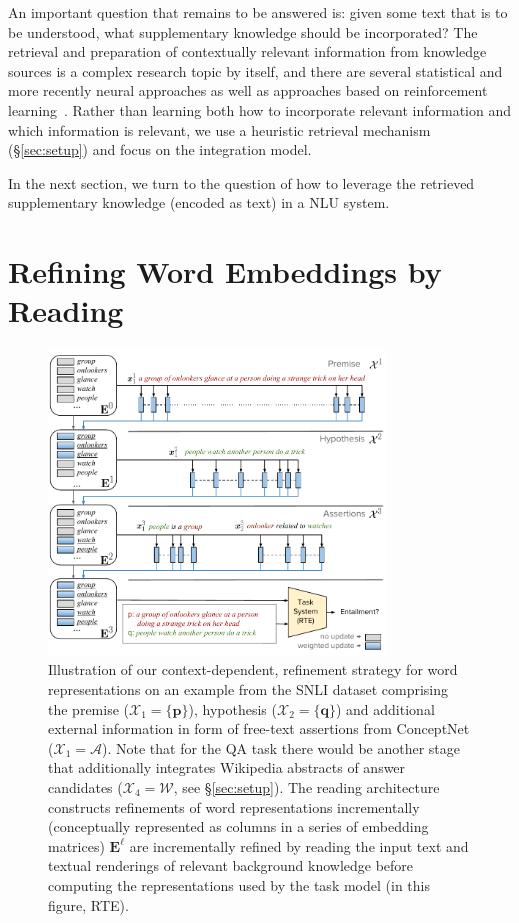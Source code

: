 \documentclass[11pt,a4paper]{article}
\begin{document}
An important question that remains to be answered is: given some text that is to be understood, what supplementary knowledge should be incorporated? The retrieval and preparation of contextually relevant information from knowledge sources is a complex research topic by itself, and there are several statistical \citep{Manning:2008} and more recently neural approaches \citep{mitra2017neural} as well as approaches based on reinforcement learning~\citep{nogueira2017}. Rather than learning both how to incorporate relevant information and which information is relevant, we use a heuristic retrieval mechanism (\S\ref{sec:setup}) and focus on the integration model.

In the next section, we turn to the question of how to leverage the retrieved supplementary knowledge (encoded as text) in a NLU system.

\section{Refining Word Embeddings by Reading}\label{sec:reading_stage}

\begin{figure}[ht!]
    \centering
    \includegraphics[width=0.8\textwidth]{illustration.pdf}
    \caption{Illustration of our context-dependent, refinement strategy for word representations on an example from the SNLI dataset comprising the premise ($\mathcal{X}_1 = \{\boldsymbol{p}\}$), hypothesis ($\mathcal{X}_2 = \{\boldsymbol{q}\}$) and additional external information in form of free-text assertions from ConceptNet ($\mathcal{X}_1 = \mathcal{A}$). Note that for the QA task there would be another stage that additionally integrates Wikipedia abstracts of answer candidates ($\mathcal{X}_4 = \mathcal{W}$, see \S\ref{sec:setup}). The reading architecture constructs refinements of word representations incrementally (conceptually represented as columns in a series of embedding matrices) $\mathbf{E}^{\ell}$ are incrementally refined by reading the input text and textual renderings of relevant background knowledge before computing the representations used by the task model (in this figure, RTE).}
    \label{fig:illustration}
\end{figure}
\end{document}
